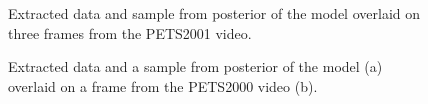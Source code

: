 \documentclass[smallcondensed, final]{svjour3}
\begin{document}
\begin{figure}[h]
        \caption{\label{fig:pets2001_alphaimg} Extracted data and sample from posterior of the model overlaid on three frames from the PETS2001 video.}
\end{figure}

\begin{figure}[h]
	\centering
	\caption{Extracted data and a sample from posterior of the model (a) overlaid on a frame from the PETS2000 video (b).}
	\label{fig:pets2000_results}
\end{figure}
\end{document}

